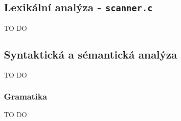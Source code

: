 \documentclass[czech,a4paper,12pt]{article}[]
\begin{document}
    \subsection{Lexikální analýza - \texttt{scanner.c}}
    \begin{inpar}
        TO DO
    \end{inpar}
    \subsection{Syntaktická a sémantická analýza}
    \begin{inpar}
        TO DO 
        \subsubsection{Gramatika}
        \begin{inpar}
            TO DO
        \end{inpar}

\end{inpar}
\end{document}
